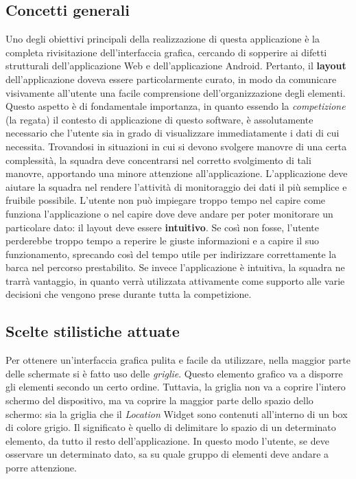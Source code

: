 \subsection{Concetti generali}
Uno degli obiettivi principali della realizzazione di questa applicazione è la completa rivisitazione dell'interfaccia grafica, cercando di sopperire ai difetti strutturali dell'applicazione Web e dell'applicazione Android. Pertanto, il \textbf{layout} dell'applicazione doveva essere particolarmente curato, in modo da comunicare visivamente all'utente una facile comprensione dell'organizzazione degli elementi. Questo aspetto è di fondamentale importanza, in quanto essendo la \textit{competizione} (la regata) il contesto di applicazione di questo software, è assolutamente necessario che l'utente sia in grado di visualizzare immediatamente i dati di cui necessita. Trovandosi in situazioni in cui si devono svolgere manovre di una certa complessità, la squadra deve concentrarsi nel corretto svolgimento di tali manovre, apportando una minore attenzione all'applicazione. L'applicazione deve aiutare la squadra nel rendere l'attività di monitoraggio dei dati il più semplice e fruibile possibile. L'utente non può impiegare troppo tempo nel capire come funziona l'applicazione o nel capire dove deve andare per poter monitorare un particolare dato: il layout deve essere \textbf{intuitivo}. Se così non fosse, l'utente perderebbe troppo tempo a reperire le giuste informazioni e a capire il suo funzionamento, sprecando così del tempo utile per indirizzare correttamente la barca nel percorso prestabilito. Se invece l'applicazione è intuitiva, la squadra ne trarrà vantaggio, in quanto verrà utilizzata attivamente come supporto alle varie decisioni che vengono prese durante tutta la competizione.

\subsection{Scelte stilistiche attuate}
Per ottenere un'interfaccia grafica pulita e facile da utilizzare, nella maggior parte delle schermate si è fatto uso delle \textit{griglie}. Questo elemento grafico va a disporre gli elementi secondo un certo ordine. Tuttavia, la griglia non va a coprire l'intero schermo del dispositivo, ma va coprire la maggior parte dello spazio dello schermo: sia la griglia che il \textit{Location} Widget sono contenuti all'interno di un box di colore grigio. Il significato è quello di delimitare lo spazio di un determinato elemento, da tutto il resto dell'applicazione. In questo modo l'utente, se deve osservare un determinato dato, sa su quale gruppo di elementi deve andare a porre attenzione.

